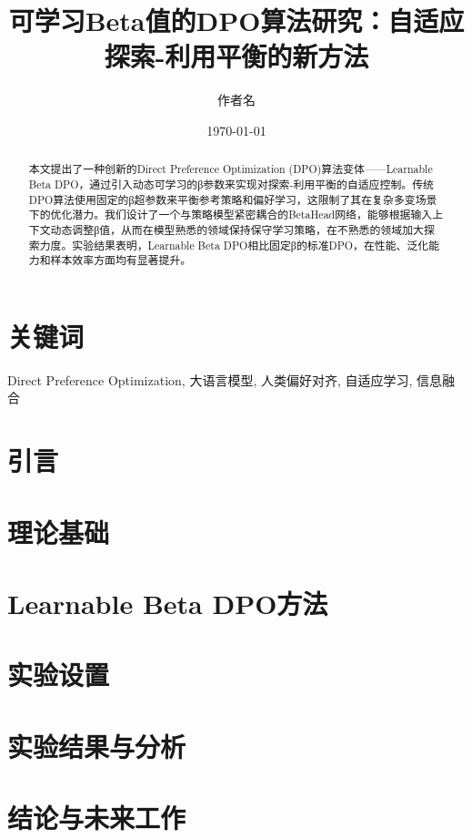 \documentclass[11pt,a4paper]{article}
\begin{document}
\begin{CJK}{UTF8}{gbsn}

\title{可学习Beta值的DPO算法研究：自适应探索-利用平衡的新方法}

\author[1]{作者名}
\date{\today}

\maketitle

\begin{abstract}
本文提出了一种创新的Direct Preference Optimization (DPO)算法变体——Learnable Beta DPO，通过引入动态可学习的β参数来实现对探索-利用平衡的自适应控制。传统DPO算法使用固定的β超参数来平衡参考策略和偏好学习，这限制了其在复杂多变场景下的优化潜力。我们设计了一个与策略模型紧密耦合的BetaHead网络，能够根据输入上下文动态调整β值，从而在模型熟悉的领域保持保守学习策略，在不熟悉的领域加大探索力度。实验结果表明，Learnable Beta DPO相比固定β的标准DPO，在性能、泛化能力和样本效率方面均有显著提升。
\end{abstract}

\section*{关键词}
Direct Preference Optimization, 大语言模型, 人类偏好对齐, 自适应学习, 信息融合

\section{引言}


\section{理论基础}


\section{Learnable Beta DPO方法}


\section{实验设置}


\section{实验结果与分析}


\section{结论与未来工作}





\end{CJK}
\end{document}
